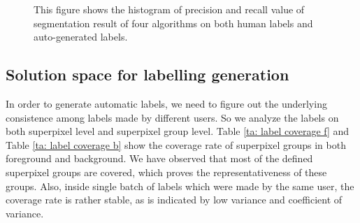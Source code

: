 \documentclass[runningheads,a4paper]{llncs}
\begin{document}
\begin{figure}[!tb]

\caption{ This figure shows the histogram of precision and recall value of segmentation result of four algorithms on both human labels and auto-generated labels.}
\label{fig:pr-human-simu}
\end{figure}


\subsection{Solution space for labelling generation}
In order to generate automatic labels, we need to figure out the underlying consistence among labels made by different users. So we analyze the labels on both superpixel level and superpixel group level. Table \ref{ta: label coverage f}  and Table \ref{ta: label coverage b} show the coverage rate of superpixel groups in both foreground and background. We have observed that most of the defined superpixel groups are covered, which proves the representativeness of these groups. Also, inside single batch of labels which were made by the same user, the coverage rate is rather stable, as is indicated by low variance and coefficient of variance.
\end{document}
